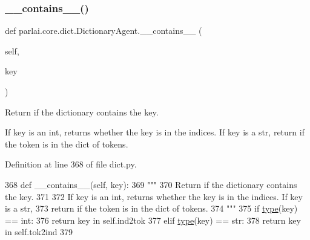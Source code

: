 \subsubsection{\texorpdfstring{\+\_\+\+\_\+contains\+\_\+\+\_\+()}{\_\_contains\_\_()}}
{\footnotesize\ttfamily def parlai.\+core.\+dict.\+Dictionary\+Agent.\+\_\+\+\_\+contains\+\_\+\+\_\+ (\begin{DoxyParamCaption}\item[{}]{self,  }\item[{}]{key }\end{DoxyParamCaption})}

\begin{DoxyVerb}Return if the dictionary contains the key.

If key is an int, returns whether the key is in the indices. If key is a str,
return if the token is in the dict of tokens.
\end{DoxyVerb}
 

Definition at line 368 of file dict.\+py.


\begin{DoxyCode}
368     \textcolor{keyword}{def }\_\_contains\_\_(self, key):
369         \textcolor{stringliteral}{"""}
370 \textcolor{stringliteral}{        Return if the dictionary contains the key.}
371 \textcolor{stringliteral}{}
372 \textcolor{stringliteral}{        If key is an int, returns whether the key is in the indices. If key is a str,}
373 \textcolor{stringliteral}{        return if the token is in the dict of tokens.}
374 \textcolor{stringliteral}{        """}
375         \textcolor{keywordflow}{if} \hyperlink{namespaceparlai_1_1agents_1_1tfidf__retriever_1_1build__tfidf_ad5dfae268e23f506da084a9efb72f619}{type}(key) == int:
376             \textcolor{keywordflow}{return} key \textcolor{keywordflow}{in} self.ind2tok
377         \textcolor{keywordflow}{elif} \hyperlink{namespaceparlai_1_1agents_1_1tfidf__retriever_1_1build__tfidf_ad5dfae268e23f506da084a9efb72f619}{type}(key) == str:
378             \textcolor{keywordflow}{return} key \textcolor{keywordflow}{in} self.tok2ind
379 
\end{DoxyCode}
\mbox{\label{classparlai_1_1core_1_1dict_1_1DictionaryAgent_a82a64989f1750412b6ffd9a4270953b3}} 

